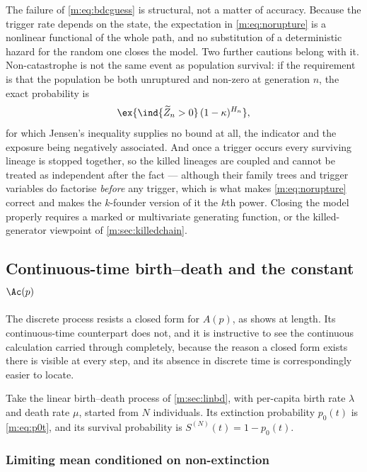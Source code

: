 \begin{remark}
\label{m:rem:notmeanfield}
The failure of \cref{m:eq:bdcguess} is structural, not a matter of accuracy. Because
the trigger rate depends on the state, the expectation in \cref{m:eq:norupture} is a
nonlinear functional of the whole path, and no substitution of a deterministic
hazard for the random one closes the model. Two further cautions belong with it.
Non-catastrophe is not the same event as population survival: if the requirement is
that the population be both unruptured and non-zero at generation $n$, the exact
probability is
\begin{equation}
\label{m:eq:jointsurvival}
\ex{\ind\{\widetilde Z_n>0\}\,(1-\kappa)^{H_n}},
\end{equation}
for which Jensen's inequality supplies no bound at all, the indicator and the
exposure being negatively associated. And once a trigger occurs every surviving
lineage is stopped together, so the killed lineages are coupled and cannot be
treated as independent after the fact --- although their family trees and trigger
variables do factorise \emph{before} any trigger, which is what makes
\cref{m:eq:norupture} correct and makes the $k$-founder version of it the $k$th
power. Closing the model properly requires a marked or multivariate generating
function, or the killed-generator viewpoint of \cref{m:sec:killedchain}.
\end{remark}

\subsection{Continuous-time birth--death and the constant \texorpdfstring{$\Ac(p)$}{Ac(p)}}
\label{m:sec:cts}

The discrete process resists a closed form for $A(p)$, as \ChA{} shows at length.
Its continuous-time counterpart does not, and it is instructive to see the
continuous calculation carried through completely, because the reason a closed form
exists there is visible at every step, and its absence in discrete time is
correspondingly easier to locate.

Take the linear birth--death process of \cref{m:sec:linbd}, with per-capita birth
rate $\lambda$ and death rate $\mu$, started from $N$ individuals. Its extinction
probability $p_0(t)$ is \cref{m:eq:p0t}, and its survival probability is
$S^{(N)}(t) = 1-p_0(t)$.

\subsubsection*{Limiting mean conditioned on non-extinction}

